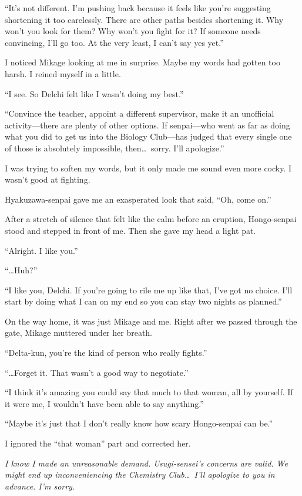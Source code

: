 \documentclass[
    a4paper,
    12pt,
    twoside,
    openany,
    UTF8,
    fontset=windows
]{ctexbook}
\begin{document}
``It's not different. I'm pushing back because it feels like you're suggesting shortening it too carelessly. There are other paths besides shortening it. Why won't you look for them? Why won't you fight for it? If someone needs convincing, I'll go too. At the very least, I can't say yes yet.''

I noticed Mikage looking at me in surprise. Maybe my words had gotten too harsh. I reined myself in a little.

``I see. So Delchi felt like I wasn't doing my best.''

``Convince the teacher, appoint a different supervisor, make it an unofficial activity---there are plenty of other options. If senpai---who went as far as doing what you did to get us into the Biology Club---has judged that every single one of those is absolutely impossible, then\dots\ sorry. I'll apologize.''

I was trying to soften my words, but it only made me sound even more cocky. I wasn't good at fighting.

Hyakuzawa-senpai gave me an exasperated look that said, ``Oh, come on.''

After a stretch of silence that felt like the calm before an eruption, Hongo-senpai stood and stepped in front of me. Then she gave my head a light pat.

``Alright. I like you.''

``\dots Huh?''

``I like you, Delchi. If you're going to rile me up like that, I've got no choice. I'll start by doing what I can on my end so you can stay two nights as planned.''

On the way home, it was just Mikage and me. Right after we passed through the gate, Mikage muttered under her breath.

``Delta-kun, you're the kind of person who really fights.''

``\dots Forget it. That wasn't a good way to negotiate.''

``I think it's amazing you could say that much to that woman, all by yourself. If it were me, I wouldn't have been able to say anything.''

``Maybe it's just that I don't really know how scary Hongo-senpai can be.''

I ignored the ``that woman'' part and corrected her.

\textit{I know I made an unreasonable demand. Usugi-sensei's concerns are valid. We might end up inconveniencing the Chemistry Club\dots\ I'll apologize to you in advance. I'm sorry.}
\end{document}
